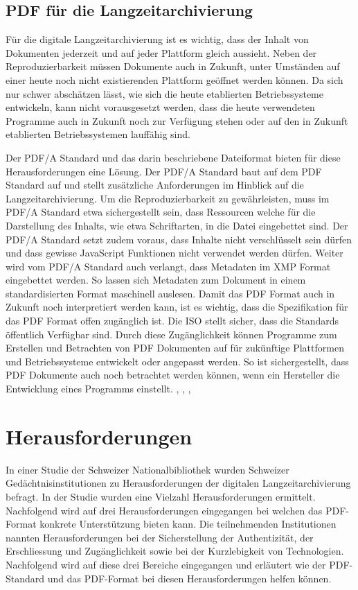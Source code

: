 \documentclass[a4paper,oneside, 12pt]{report}
\begin{document}
\section{PDF für die Langzeitarchivierung}
Für die digitale Langzeitarchivierung ist es wichtig, dass der Inhalt von Dokumenten jederzeit und auf jeder Plattform gleich aussieht. Neben der Reproduzierbarkeit müssen Dokumente auch in Zukunft, unter Umständen auf einer heute noch nicht existierenden Plattform geöffnet werden können. Da sich nur schwer abschätzen lässt, wie sich die heute etablierten Betriebssysteme entwickeln, kann nicht vorausgesetzt werden, dass die heute verwendeten Programme auch in Zukunft noch zur Verfügung stehen oder auf den in Zukunft etablierten Betriebssystemen lauffähig sind.

Der PDF/A Standard und das darin beschriebene Dateiformat bieten für diese Herausforderungen eine Lösung. Der PDF/A Standard baut auf dem PDF Standard auf und stellt zusätzliche Anforderungen im Hinblick auf die Langzeitarchivierung. Um die Reproduzierbarkeit zu gewährleisten, muss im PDF/A Standard etwa sichergestellt sein, dass Ressourcen welche für die Darstellung des Inhalts, wie etwa Schriftarten, in die Datei eingebettet sind. Der PDF/A Standard setzt zudem voraus, dass Inhalte nicht verschlüsselt sein dürfen und dass gewisse JavaScript Funktionen nicht verwendet werden dürfen. Weiter wird vom PDF/A Standard auch verlangt, dass Metadaten im \ac{XMP} Format eingebettet werden. So lassen sich Metadaten zum Dokument in einem standardisierten Format maschinell auslesen. Damit das PDF Format auch in Zukunft noch interpretiert werden kann, ist es wichtig, dass die Spezifikation für das PDF Format offen zugänglich ist. Die \ac{ISO} stellt sicher, dass die Standards öffentlich Verfügbar sind. Durch diese Zugänglichkeit können Programme zum Erstellen und Betrachten von PDF Dokumenten auf für zukünftige Plattformen und Betriebssysteme entwickelt oder angepasst werden. So ist sichergestellt, dass PDF Dokumente auch noch betrachtet werden können, wenn ein Hersteller die Entwicklung eines Programms einstellt. \cite{pdfanutshell}, \cite{Arms2005DigitalFF}, \cite{ISO32000}, \cite{ISO19005}

 
\chapter{Herausforderungen}\label{sec:herausforderungen}
In einer Studie der Schweizer Nationalbibliothek wurden Schweizer Gedächtnisinstitutionen zu Herausforderungen der digitalen Langzeitarchivierung befragt. In der Studie wurden eine Vielzahl Herausforderungen ermittelt. Nachfolgend wird auf drei Herausforderungen eingegangen bei welchen das PDF-Format konkrete Unterstützung bieten kann. Die teilnehmenden Institutionen nannten Herausforderungen bei der Sicherstellung der Authentizität, der Erschliessung und Zugänglichkeit sowie bei der Kurzlebigkeit von Technologien. Nachfolgend wird auf diese drei Bereiche eingegangen und erläutert wie der PDF-Standard und das PDF-Format bei diesen Herausforderungen helfen können. \cite{lzaschweiz}
\end{document}
